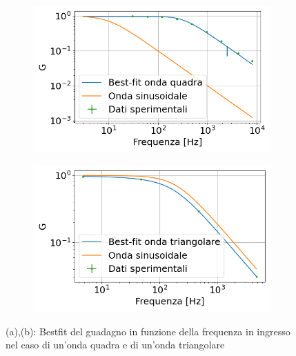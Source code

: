 \documentclass{article}
\begin{document}
    \begin{figure}[htbp]
            \centering
            \begin{subfigure}{0.45\textwidth} %
                \centering
                \includegraphics[width=\textwidth]{gain_squarewave.png} %
                \caption{}
                \label{fig:image1}
            \end{subfigure}
            \hfill %
            \begin{subfigure}{0.45\textwidth} %
                \centering
                \includegraphics[width=\textwidth]{gain_trianwave.png} %
                \caption{}
                \label{fig:image2}
            \end{subfigure}
            \caption{(a),(b): Bestfit del guadagno in funzione della frequenza in ingresso nel caso di un'onda quadra e di un'onda triangolare}
            \label{fig:side_by_side_images}
        \end{figure}
\end{document}
